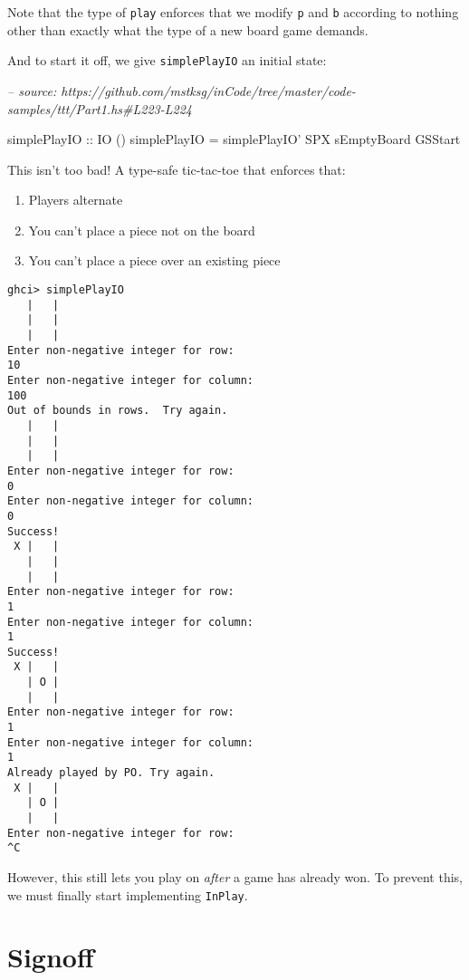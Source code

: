 \documentclass[]{article}
\newenvironment{Shaded}{}{}
\newcommand{\CommentTok}[1]{\textcolor[rgb]{0.38,0.63,0.69}{\textit{#1}}}
\newcommand{\DataTypeTok}[1]{\textcolor[rgb]{0.56,0.13,0.00}{#1}}
\newcommand{\FunctionTok}[1]{\textcolor[rgb]{0.02,0.16,0.49}{#1}}
\newcommand{\NormalTok}[1]{#1}
\newcommand{\OtherTok}[1]{\textcolor[rgb]{0.00,0.44,0.13}{#1}}
\begin{document}
Note that the type of \texttt{play} enforces that we modify \texttt{p} and
\texttt{b} according to nothing other than exactly what the type of a new board
game demands.

And to start it off, we give \texttt{simplePlayIO\textquotesingle{}} an initial
state:

\begin{Shaded}
\begin{Highlighting}[]
\CommentTok{-- source: https://github.com/mstksg/inCode/tree/master/code-samples/ttt/Part1.hs#L223-L224}

\OtherTok{simplePlayIO ::} \DataTypeTok{IO}\NormalTok{ ()}
\NormalTok{simplePlayIO }\FunctionTok{=}\NormalTok{ simplePlayIO' }\DataTypeTok{SPX}\NormalTok{ sEmptyBoard }\DataTypeTok{GSStart}
\end{Highlighting}
\end{Shaded}

This isn't too bad! A type-safe tic-tac-toe that enforces that:

\begin{enumerate}
\def\labelenumi{\arabic{enumi}.}
\tightlist
\item
  Players alternate
\item
  You can't place a piece not on the board
\item
  You can't place a piece over an existing piece
\end{enumerate}

\begin{verbatim}
ghci> simplePlayIO
   |   |
   |   |
   |   |
Enter non-negative integer for row:
10
Enter non-negative integer for column:
100
Out of bounds in rows.  Try again.
   |   |
   |   |
   |   |
Enter non-negative integer for row:
0
Enter non-negative integer for column:
0
Success!
 X |   |
   |   |
   |   |
Enter non-negative integer for row:
1
Enter non-negative integer for column:
1
Success!
 X |   |
   | O |
   |   |
Enter non-negative integer for row:
1
Enter non-negative integer for column:
1
Already played by PO. Try again.
 X |   |
   | O |
   |   |
Enter non-negative integer for row:
^C
\end{verbatim}

However, this still lets you play on \emph{after} a game has already won. To
prevent this, we must finally start implementing \texttt{InPlay}.

\hypertarget{signoff}{%
\section{Signoff}\label{signoff}}
\end{document}
